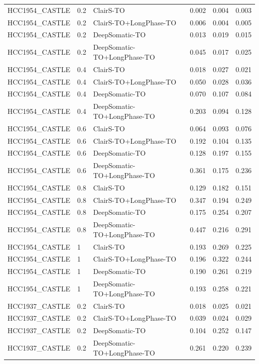 \documentclass[pdflatex,sn-nature]{sn-jnl}
\begin{document}
{\begin{longtable}{@{}lllccc@{}}
  \addlinespace
  HCC1954\_CASTLE & 0.2 & ClairS-TO & 0.002 & 0.004 & 0.003 \\
  HCC1954\_CASTLE & 0.2 & ClairS-TO+LongPhase-TO & 0.006 & 0.004 & 0.005 \\
  HCC1954\_CASTLE & 0.2 & DeepSomatic-TO & 0.013 & 0.019 & 0.015 \\
  HCC1954\_CASTLE & 0.2 & DeepSomatic-TO+LongPhase-TO & 0.045 & 0.017 & 0.025 \\
  HCC1954\_CASTLE & 0.4 & ClairS-TO & 0.018 & 0.027 & 0.021 \\
  HCC1954\_CASTLE & 0.4 & ClairS-TO+LongPhase-TO & 0.050 & 0.028 & 0.036 \\
  HCC1954\_CASTLE & 0.4 & DeepSomatic-TO & 0.070 & 0.107 & 0.084 \\
  HCC1954\_CASTLE & 0.4 & DeepSomatic-TO+LongPhase-TO & 0.203 & 0.094 & 0.128 \\
  HCC1954\_CASTLE & 0.6 & ClairS-TO & 0.064 & 0.093 & 0.076 \\
  HCC1954\_CASTLE & 0.6 & ClairS-TO+LongPhase-TO & 0.192 & 0.104 & 0.135 \\
  HCC1954\_CASTLE & 0.6 & DeepSomatic-TO & 0.128 & 0.197 & 0.155 \\
  HCC1954\_CASTLE & 0.6 & DeepSomatic-TO+LongPhase-TO & 0.361 & 0.175 & 0.236 \\
  HCC1954\_CASTLE & 0.8 & ClairS-TO & 0.129 & 0.182 & 0.151 \\
  HCC1954\_CASTLE & 0.8 & ClairS-TO+LongPhase-TO & 0.347 & 0.194 & 0.249 \\
  HCC1954\_CASTLE & 0.8 & DeepSomatic-TO & 0.175 & 0.254 & 0.207 \\
  HCC1954\_CASTLE & 0.8 & DeepSomatic-TO+LongPhase-TO & 0.447 & 0.216 & 0.291 \\
  HCC1954\_CASTLE & 1 & ClairS-TO & 0.193 & 0.269 & 0.225 \\
  HCC1954\_CASTLE & 1 & ClairS-TO+LongPhase-TO & 0.196 & 0.322 & 0.244 \\
  HCC1954\_CASTLE & 1 & DeepSomatic-TO & 0.190 & 0.261 & 0.219 \\
  HCC1954\_CASTLE & 1 & DeepSomatic-TO+LongPhase-TO & 0.193 & 0.258 & 0.221 \\
  \addlinespace
  HCC1937\_CASTLE & 0.2 & ClairS-TO & 0.018 & 0.025 & 0.021 \\
  HCC1937\_CASTLE & 0.2 & ClairS-TO+LongPhase-TO & 0.039 & 0.024 & 0.029 \\
  HCC1937\_CASTLE & 0.2 & DeepSomatic-TO & 0.104 & 0.252 & 0.147 \\
  HCC1937\_CASTLE & 0.2 & DeepSomatic-TO+LongPhase-TO & 0.261 & 0.220 & 0.239 \\

\end{longtable}}
\end{document}

